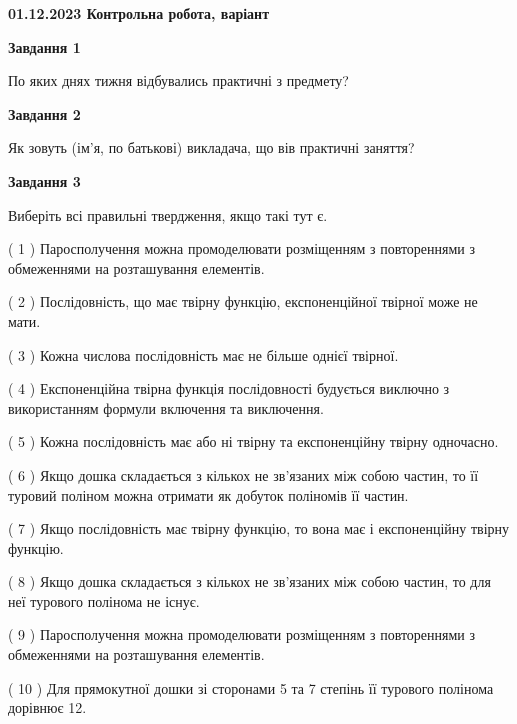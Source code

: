 \documentclass[12pt, ukrainian]{article}
\begin{document}
\begin {large}

\textbf{01.12.2023 Контрольна робота, варіант  }\par


{
{\begin {center}\textbf{Завдання 1}\end {center}}\par
По яких днях тижня відбувались практичні з предмету?\par
{\begin {center}\textbf{Завдання 2}\end {center}}\par
Як зовуть (ім'я, по батькові) викладача, що вів практичні заняття?\par
{\begin {center}\textbf{Завдання 3}\end {center}}\par
Виберіть всі правильні твердження, якщо такі тут є.\par
\vspace{2mm}
( 1 ) Паросполучення можна промоделювати розміщенням з повтореннями з обмеженнями на розташування елементів.%

( 2 ) Послідовність, що має твірну функцію, експоненційної твірної може не мати.%

( 3 ) Кожна числова послідовність має не більше однієї твірної.%

( 4 ) Експоненційна твірна функція послідовності будується виключно з використанням формули включення та виключення.%

( 5 ) Кожна послідовність має або ні твірну та експоненційну твірну одночасно.%

( 6 ) Якщо дошка складається з кількох не зв’язаних між собою частин, то її туровий поліном можна отримати як добуток поліномів її частин.%

( 7 ) Якщо послідовність має твірну функцію, то вона має і експоненційну твірну функцію.%

( 8 ) Якщо дошка складається з кількох не зв’язаних між собою частин, то для неї турового полінома не існує.%

( 9 ) Паросполучення можна промоделювати розміщенням з повтореннями з обмеженнями на розташування елементів.%

( 10 ) Для прямокутної дошки зі сторонами 5 та 7 степінь її турового полінома дорівнює 12.%
}
\end {large}

\vspace{4mm}
\newpage
\end{document}
